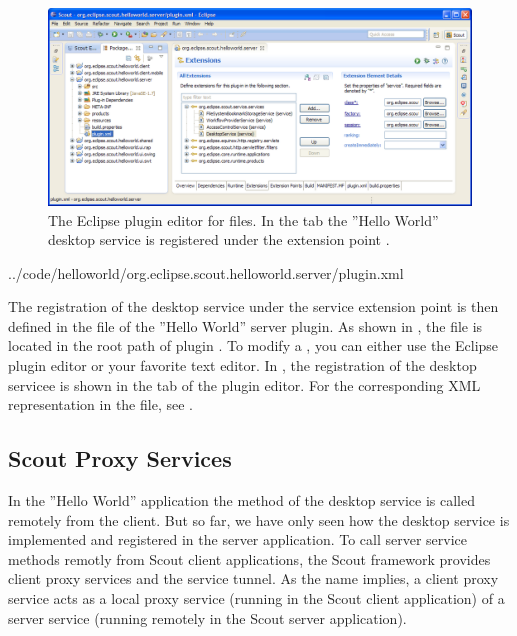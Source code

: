 \documentclass[a4paper,10pt,twoside]{book}
\begin{document}
\begin{figure}
\includegraphics[width=14cm]{sdk_plugin_editor_desktopservice.png}
\caption{The Eclipse plugin editor for  files.
In the tab  the ''Hello World'' desktop service is registered under the extension point .
}
\end{figure}


{../code/helloworld/org.eclipse.scout.helloworld.server/plugin.xml}

The registration of the desktop service under the service extension point is then defined in the  file of the ''Hello World'' server plugin.
As shown in , the  file is located in the root path of plugin .
To modify a , you can either use the Eclipse plugin editor or your favorite text editor.
In , the registration of the desktop servicee is shown in the  tab of the plugin editor.
For the corresponding XML representation in the  file, see .

\subsection{Scout Proxy Services}

In the ''Hello World'' application the  method of the desktop service is called remotely from the client.
But so far, we have only seen how the desktop service is implemented and registered in the server application.
To call server service methods remotly from Scout client applications, the Scout framework provides client proxy services and the service tunnel.
As the name implies, a client proxy service acts as a local proxy service (running in the Scout client application) of a server service (running remotely in the Scout server application).
\end{document}
